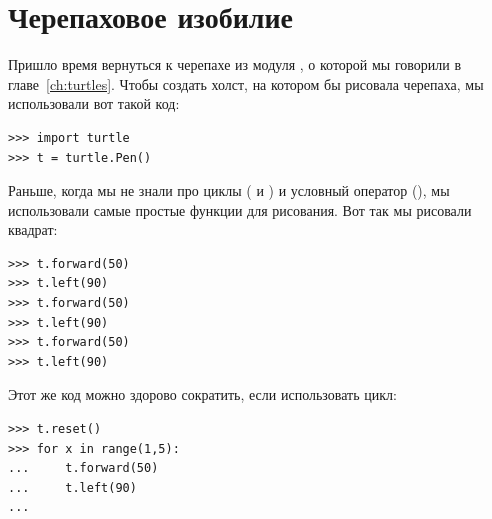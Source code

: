 %
%
%

\chapter{Черепаховое изобилие}\label{ch:turtlesgalore}

Пришло время вернуться к черепахе из модуля , о которой мы говорили в главе \ref{ch:turtles}. Чтобы создать холст, на котором бы рисовала черепаха, мы использовали вот такой код:

\begin{listing}
\begin{verbatim}
>>> import turtle
>>> t = turtle.Pen()
\end{verbatim}
\end{listing}

Раньше, когда мы не знали про циклы ( и ) и условный оператор (), мы использовали самые простые функции для рисования. Вот так мы рисовали квадрат:

\begin{listing}
\begin{verbatim}
>>> t.forward(50)
>>> t.left(90)
>>> t.forward(50)
>>> t.left(90)
>>> t.forward(50)
>>> t.left(90)
\end{verbatim}
\end{listing} 

Этот же код можно здорово сократить, если использовать цикл:

\begin{listing}
\begin{verbatim}
>>> t.reset()
>>> for x in range(1,5):
...     t.forward(50)
...     t.left(90)
...
\end{verbatim}
\end{listing}

